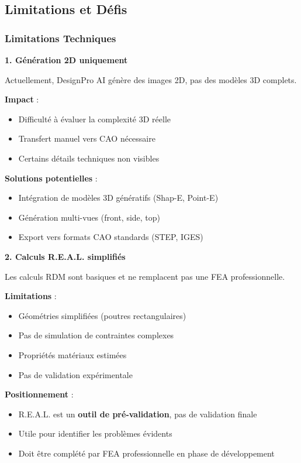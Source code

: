 \subsection{Limitations et Défis}

\subsubsection{Limitations Techniques}

\textbf{1. Génération 2D uniquement}

Actuellement, DesignPro AI génère des images 2D, pas des modèles 3D complets.

\textbf{Impact} :
\begin{itemize}[leftmargin=*]
    \item Difficulté à évaluer la complexité 3D réelle
    \item Transfert manuel vers CAO nécessaire
    \item Certains détails techniques non visibles
\end{itemize}

\textbf{Solutions potentielles} :
\begin{itemize}[leftmargin=*]
    \item Intégration de modèles 3D génératifs (Shap-E, Point-E)
    \item Génération multi-vues (front, side, top)
    \item Export vers formats CAO standards (STEP, IGES)
\end{itemize}

\textbf{2. Calculs R.E.A.L. simplifiés}

Les calculs RDM sont basiques et ne remplacent pas une FEA professionnelle.

\textbf{Limitations} :
\begin{itemize}[leftmargin=*]
    \item Géométries simplifiées (poutres rectangulaires)
    \item Pas de simulation de contraintes complexes
    \item Propriétés matériaux estimées
    \item Pas de validation expérimentale
\end{itemize}

\textbf{Positionnement} :
\begin{itemize}[leftmargin=*]
    \item R.E.A.L. est un \textbf{outil de pré-validation}, pas de validation finale
    \item Utile pour identifier les problèmes évidents
    \item Doit être complété par FEA professionnelle en phase de développement
\end{itemize}

